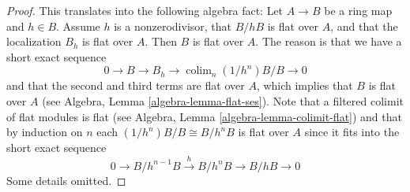 \documentclass[10pt,a4paper]{amsart}
\theoremstyle{plain}
\theoremstyle{definition}
\theoremstyle{remark}
\numberwithin{equation}{subsection}
\def\colim{\mathop{\mathrm{colim}}\nolimits}
\begin{document}
\begin{proof}
This translates into the following algebra fact:
Let $A \to B$ be a ring map and $h \in B$.
Assume $h$ is a nonzerodivisor, that $B/hB$ is flat over $A$, and
that the localization $B_h$ is flat over $A$. Then $B$ is flat over $A$.
The reason is that we have a short exact sequence
$$
0 \to B \to B_h \to \colim_n (1/h^n)B/B \to 0
$$
and that the second and third terms are flat over $A$, which implies
that $B$ is flat over $A$ (see
Algebra, Lemma \ref{algebra-lemma-flat-ses}). Note that a filtered
colimit of flat modules is flat (see
Algebra, Lemma \ref{algebra-lemma-colimit-flat})
and that by induction on $n$ each $(1/h^n)B/B \cong B/h^nB$ is flat over
$A$ since it fits into the short exact sequence
$$
0 \to B/h^{n - 1}B \xrightarrow{h} B/h^nB \to B/hB \to 0
$$
Some details omitted.
\end{proof}
\end{document}
